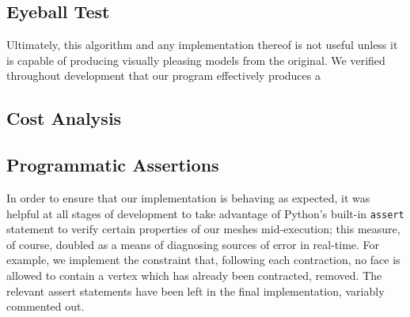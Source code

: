 \documentclass{acmsiggraph}
\begin{document}
\subsection{Eyeball Test}
Ultimately, this algorithm and any implementation thereof is not useful unless
it is capable of producing visually pleasing models from the original. We
verified throughout development that our program effectively produces a


\subsection{Cost Analysis}

\subsection{Programmatic Assertions}
In order to ensure that our implementation is behaving as expected, it was
helpful at all stages of development to take advantage of Python’s built-in
\texttt{assert} statement to verify certain properties of our meshes 
mid-execution; this measure, of course, doubled as a means of diagnosing
sources of error in real-time. For example, we implement the constraint that,
following each contraction, no face is allowed to contain a vertex which has
already been contracted, removed. The relevant assert statements have been left
in the final implementation, variably commented out.
\end{document}
